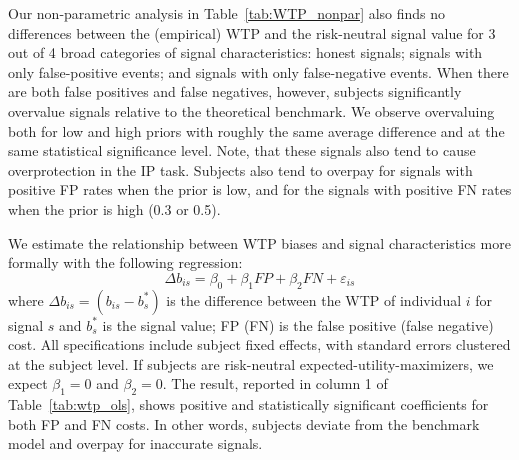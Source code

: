 \documentclass[12pt,a4paper]{article}
\begin{document}
Our non-parametric analysis in Table~\ref{tab:WTP_nonpar} also finds no differences between the (empirical) WTP and the risk-neutral signal value for 3 out of 4 broad categories of signal characteristics: honest signals; signals with only false-positive events; and signals with only false-negative events. When there are both false positives and false negatives, however, subjects significantly overvalue signals relative to the theoretical benchmark. We observe overvaluing both for low and high priors with roughly the same average difference and at the same statistical significance level. Note, that these signals also tend to cause overprotection in the IP task. Subjects also tend to overpay for signals with positive FP rates when the prior is low, and for the signals with positive FN rates when the prior is high (0.3 or 0.5).



%




We estimate the relationship between WTP biases and signal characteristics more formally with the following regression:
\[\Delta b_{is} = \beta_0 + \beta_1 FP + \beta_2 FN + \varepsilon_{is}\]
where $\Delta b_{is} = (b_{is} - b^*_s)$ is the difference between the WTP of individual $i$ for signal $s$ and $b^*_s$ is the signal value; FP (FN) is the false positive (false negative) cost. All specifications include subject fixed effects, with standard errors clustered at the subject level. If subjects are risk-neutral expected-utility-maximizers, we expect $\beta_1=0$ and $\beta_2=0$. The result, reported in column 1 of Table~\ref{tab:wtp_ols}, shows positive and statistically significant coefficients for both FP and FN costs. In other words, subjects deviate from the benchmark model and overpay for inaccurate signals. 


\end{document}

